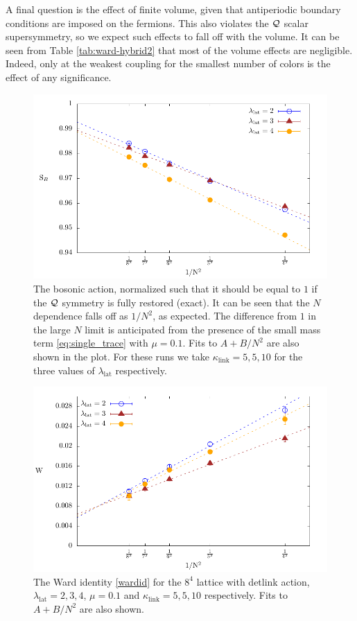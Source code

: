 A final question is the effect of finite volume, given that antiperiodic boundary
conditions are imposed on the fermions.  This also violates the $\mathcal Q$ scalar supersymmetry,
so we expect such effects to fall off with the volume.  It can be seen from Table
\ref{tab:ward-hybrid2} that most of the volume effects are negligible.  Indeed, only
at the weakest coupling for the smallest number of colors is the effect of
any significance.

\begin{figure}
\begin{center}
\includegraphics[width=5in]{./Figures/action_detlink_L8.pdf}
\caption{The bosonic action, normalized such that it should be equal to $1$ if
the $\mathcal Q$ symmetry is fully restored (exact).  It can be seen that the $N$ dependence
falls off as $1/N^2$, as expected.  The difference from $1$ in the large $N$
limit is anticipated from the presence of the small
mass term \ref{eq:single_trace} with $\mu=0.1$. Fits to $A + B/N^2$ are also shown in the plot.
For these runs we take $\kappa_\text{link}=5,5,10$ for the three values of $\lambda_{\text{lat}}$ respectively.
\label{SBcombo}}
\end{center}
\end{figure}

\begin{figure}
\begin{center}
\includegraphics[width=5in]{./Figures/ward_detlink_L8.pdf}
\caption{The Ward identity \ref{wardid} for the $8^4$ lattice with detlink action, 
$\lambda_{\text{lat}}=2,3,4$, $\mu=0.1$ and $\kappa_\text{link}=5,5,10$ respectively. 
Fits to $A + B/N^2$ are also shown. 
\label{wdl468}}
\end{center}
\end{figure}


